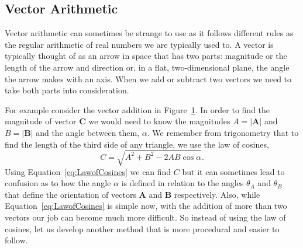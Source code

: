 \documentclass[main.tex]{subfiles}
\begin{document}
\subsection*{Vector Arithmetic}
Vector arithmetic can sometimes be strange to use as it follows different rules as the regular arithmetic of real numbers we are typically used to. A vector is typically thought of as an arrow in space that has two parts: magnitude or the length of the arrow and direction or, in a flat, two-dimensional plane, the angle the arrow makes with an axis. When we add or subtract two vectors we need to take both parts into consideration.
\begin{figure}[h]
\centering
{}
\caption{} \label{fig:LawCosines}
\end{figure}
For example consider the vector addition in Figure~\ref{fig:LawCosines}. In order to find the magnitude of vector $\mathbf{C}$ we would need to know the magnitudes $A=|\mathbf{A}|$ and $B=|\mathbf{B}|$ and the angle between them, $\alpha.$ We remember from trigonometry that to find the length of the third side of any triangle, we use the law of cosines,
\begin{equation}\label{eq:LawofCosines}
C=\sqrt{A^2+B^2-2AB\cos\alpha}.
\end{equation}
Using Equation~\eqref{eq:LawofCosines} we can find $C$ but it can sometimes lead to confusion as to how the angle $\alpha$ is defined in relation to the angles $\theta_A$ and $\theta_B$ that define the orientation of vectors $\mathbf{A}$ and $\mathbf{B}$ respectively. Also, while Equation~\eqref{eq:LawofCosines} is simple now, with the addition of more than two vectors our job can become much more difficult. So instead of using the law of cosines, let us develop another method that is more procedural and easier to follow.
\end{document}
